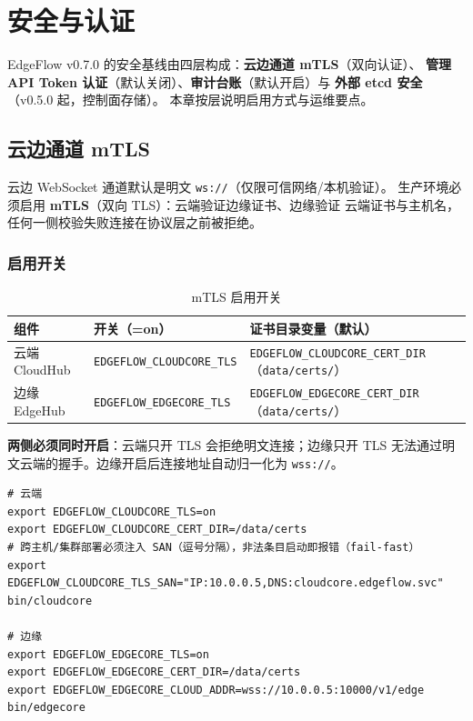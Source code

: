 \chapter{安全与认证}
\label{ch:8}

EdgeFlow v0.7.0 的安全基线由四层构成：\textbf{云边通道 mTLS}（双向认证）、
\textbf{管理 API Token 认证}（默认关闭）、\textbf{审计台账}（默认开启）与
\textbf{外部 etcd 安全}（v0.5.0 起，控制面存储）。
本章按层说明启用方式与运维要点。

\section{云边通道 mTLS}

云边 WebSocket 通道默认是明文 \texttt{ws://}（仅限可信网络/本机验证）。
生产环境必须启用 \textbf{mTLS}（双向 TLS）：云端验证边缘证书、边缘验证
云端证书与主机名，任何一侧校验失败连接在协议层之前被拒绝。

\subsection{启用开关}

\begin{table}[htbp]
\centering
\caption{mTLS 启用开关}
\label{tab:8-tls}
\begin{tabularx}{\textwidth}{l l X}
\toprule
\textbf{组件} & \textbf{开关（=on）} & \textbf{证书目录变量（默认）} \\
\midrule
云端 CloudHub & \texttt{EDGEFLOW\_CLOUDCORE\_TLS} & \texttt{EDGEFLOW\_CLOUDCORE\_CERT\_DIR}（\texttt{data/certs/}） \\
边缘 EdgeHub & \texttt{EDGEFLOW\_EDGECORE\_TLS} & \texttt{EDGEFLOW\_EDGECORE\_CERT\_DIR}（\texttt{data/certs/}） \\
\bottomrule
\end{tabularx}
\end{table}

\textbf{两侧必须同时开启}：云端只开 TLS 会拒绝明文连接；边缘只开 TLS
无法通过明文云端的握手。边缘开启后连接地址自动归一化为 \texttt{wss://}。

\begin{lstlisting}
# 云端
export EDGEFLOW_CLOUDCORE_TLS=on
export EDGEFLOW_CLOUDCORE_CERT_DIR=/data/certs
# 跨主机/集群部署必须注入 SAN（逗号分隔），非法条目启动即报错（fail-fast）
export EDGEFLOW_CLOUDCORE_TLS_SAN="IP:10.0.0.5,DNS:cloudcore.edgeflow.svc"
bin/cloudcore

# 边缘
export EDGEFLOW_EDGECORE_TLS=on
export EDGEFLOW_EDGECORE_CERT_DIR=/data/certs
export EDGEFLOW_EDGECORE_CLOUD_ADDR=wss://10.0.0.5:10000/v1/edge
bin/edgecore
\end{lstlisting}

